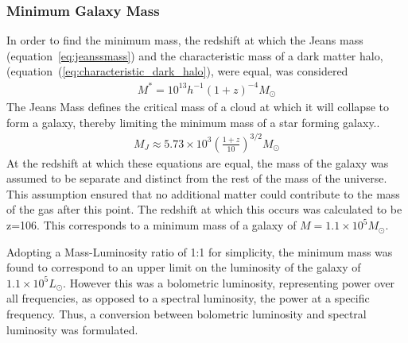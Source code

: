 		\subsubsection{Minimum Galaxy Mass} %
		\label{ssub:minimum_galaxy_mass}
			In order to find the minimum mass, the redshift at which the Jeans mass (equation~\ref{eq:jeanssmass}) and the characteristic mass of a dark matter halo, (equation~(\ref{eq:characteristic_dark_halo}), were equal, was considered\cite{Barkana2001125}
			\begin{align}
				M^*=10^{13}h^{-1}(1+z)^{-4} M_\odot \label{eq:characteristic_dark_halo}
			\end{align}
			The Jeans Mass defines the critical mass of a cloud at which it will collapse to form a galaxy, thereby limiting the minimum mass of a star forming galaxy.\cite{Barkana2001125}.
			\begin{align}
				M_J \approx 5.73\times10^3 \left (\frac{1+z}{10} \right )^{3/2} M_{\odot} \label{eq:jeanssmass}
			\end{align}
			At the redshift at which these equations are equal, the mass of the galaxy was assumed to be separate and distinct from the rest of the mass of the universe. This assumption ensured that no additional matter could contribute to the mass of the gas after this point. The redshift at which this occurs was calculated to be z=106. This corresponds to a minimum mass of a galaxy of $M=1.1\times10^5M_\odot$.

			Adopting a Mass-Luminosity ratio of 1:1 for simplicity, the minimum mass was found to correspond to an upper limit on the luminosity of the galaxy of $1.1\times 10^5 L_\odot$. However this was a bolometric luminosity, representing power over all frequencies, as opposed to a spectral luminosity, the power at  a specific frequency. Thus, a conversion between bolometric luminosity and spectral luminosity was formulated.


